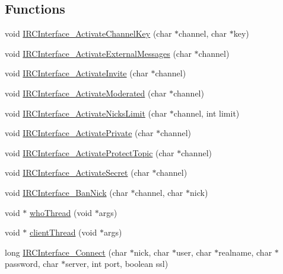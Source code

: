 \subsection*{Functions}
\begin{DoxyCompactItemize}
\item 
void \hyperlink{_g-2301-05-_p2-xchat2_8c_a33f80a29a744e4182b29e23f13c1f05c}{I\-R\-C\-Interface\-\_\-\-Activate\-Channel\-Key} (char $\ast$channel, char $\ast$key)
\item 
void \hyperlink{_g-2301-05-_p2-xchat2_8c_a7a439929c246e342ae525139b2c39f5d}{I\-R\-C\-Interface\-\_\-\-Activate\-External\-Messages} (char $\ast$channel)
\item 
void \hyperlink{_g-2301-05-_p2-xchat2_8c_ac72762ab1e3575b421b967241db23f9c}{I\-R\-C\-Interface\-\_\-\-Activate\-Invite} (char $\ast$channel)
\item 
void \hyperlink{_g-2301-05-_p2-xchat2_8c_af83498f4058311f4562c43a9b70566b2}{I\-R\-C\-Interface\-\_\-\-Activate\-Moderated} (char $\ast$channel)
\item 
void \hyperlink{_g-2301-05-_p2-xchat2_8c_ab5694cc413472173bfcaa969c7d9800e}{I\-R\-C\-Interface\-\_\-\-Activate\-Nicks\-Limit} (char $\ast$channel, int limit)
\item 
void \hyperlink{_g-2301-05-_p2-xchat2_8c_ab1f09c737c7c109a97e22de6072d731d}{I\-R\-C\-Interface\-\_\-\-Activate\-Private} (char $\ast$channel)
\item 
void \hyperlink{_g-2301-05-_p2-xchat2_8c_ac45f12d4dcacf3b5485eec6fdc51df93}{I\-R\-C\-Interface\-\_\-\-Activate\-Protect\-Topic} (char $\ast$channel)
\item 
void \hyperlink{_g-2301-05-_p2-xchat2_8c_aa9e9155115b834d85a4d10cb27f99093}{I\-R\-C\-Interface\-\_\-\-Activate\-Secret} (char $\ast$channel)
\item 
void \hyperlink{_g-2301-05-_p2-xchat2_8c_a42773b5a840f9d0455f148d285e1e595}{I\-R\-C\-Interface\-\_\-\-Ban\-Nick} (char $\ast$channel, char $\ast$nick)
\item 
void $\ast$ \hyperlink{_g-2301-05-_p2-xchat2_8c_a4f5f3137c3be732b92b32a2de87deb58}{who\-Thread} (void $\ast$args)
\item 
void $\ast$ \hyperlink{_g-2301-05-_p2-xchat2_8c_a88a0a12cb382400bbca561b8f83efe73}{client\-Thread} (void $\ast$args)
\item 
long \hyperlink{_g-2301-05-_p2-xchat2_8c_aed072f4ce0d6e90697d4d6eb0278a2ad}{I\-R\-C\-Interface\-\_\-\-Connect} (char $\ast$nick, char $\ast$user, char $\ast$realname, char $\ast$password, char $\ast$server, int port, boolean ssl)

\end{DoxyCompactItemize}
